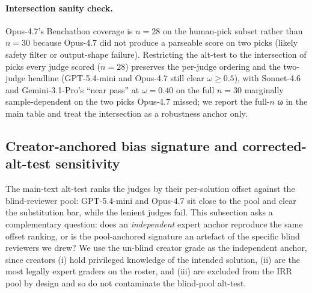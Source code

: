 \documentclass[11pt]{article}
\begin{document}




\paragraph{Intersection sanity check.} Opus-4.7's Benchathon coverage is
\(n=28\) on the human-pick subset rather than \(n=30\) because Opus-4.7
did not produce a parseable score on two picks (likely safety filter or
output-shape failure). Restricting the alt-test to the intersection of
picks every judge scored (\(n=28\)) preserves the per-judge ordering and
the two-judge headline (GPT-5.4-mini and Opus-4.7 still clear
\(\omega\geq 0.5\)), with Sonnet-4.6 and Gemini-3.1-Pro's ``near pass''
at \(\omega=0.40\) on the full \(n=30\) marginally sample-dependent on
the two picks Opus-4.7 missed; we report the full-\(n\) ω in the main
table and treat the intersection as a robustness anchor only.

\subsection{Creator-anchored bias signature and corrected-alt-test
sensitivity}\label{sec-creator-anchored-calibration}

The main-text alt-test ranks the judges by their per-solution offset
against the blind-reviewer pool: GPT-5.4-mini and Opus-4.7 sit close to
the pool and clear the substitution bar, while the lenient judges fail.
This subsection asks a complementary question: does an
\emph{independent} expert anchor reproduce the same offset ranking, or
is the pool-anchored signature an artefact of the specific blind
reviewers we drew? We use the un-blind creator grade as the independent
anchor, since creators (i) hold privileged knowledge of the intended
solution, (ii) are the most legally expert graders on the roster, and
(iii) are excluded from the IRR pool by design and so do not contaminate
the blind-pool alt-test.
\end{document}
